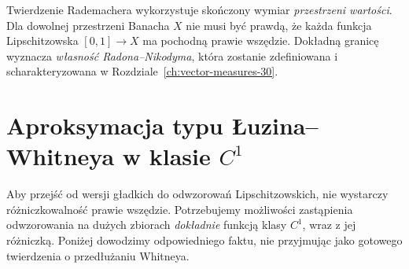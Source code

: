 \begin{uwaga}
Twierdzenie Rademachera wykorzystuje skończony wymiar
\emph{przestrzeni wartości}. Dla dowolnej przestrzeni
Banacha $X$ nie musi być prawdą, że każda funkcja
Lipschitzowska $[0,1]\to X$ ma pochodną prawie wszędzie.
Dokładną granicę wyznacza \emph{własność Radona--Nikodyma},
która zostanie zdefiniowana i scharakteryzowana w
Rozdziale~\ref{ch:vector-measures-30}.
\end{uwaga}

\section{Aproksymacja typu Łuzina--Whitneya w klasie \texorpdfstring{$C^1$}{C\string^1}}
Aby przejść od wersji gładkich do odwzorowań Lipschitzowskich,
nie wystarczy różniczkowalność prawie wszędzie. Potrzebujemy
możliwości zastąpienia odwzorowania na dużych zbiorach
\emph{dokładnie} funkcją klasy $C^1$, wraz z jej różniczką.
Poniżej dowodzimy odpowiedniego faktu, nie przyjmując
jako gotowego twierdzenia o przedłużaniu Whitneya.

